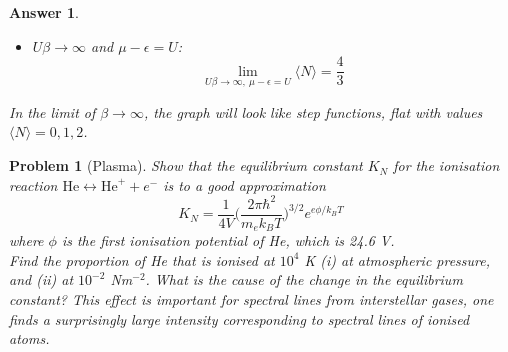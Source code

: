 \documentclass[a4paper]{article}
\theoremstyle{new2}
\newtheorem{ans}{Answer}[section]
\theoremstyle{new}
\newtheorem{qns}{Problem}[section]
\begin{document}
\begin{ans}
\begin{itemize}
    $$\lim_{U\beta\rightarrow\infty,~\mu-\epsilon>0}\langle N\rangle=2$$
    Here, $\mu$ is so large that the reservoir floods all the energy levels, hence giving maximum occupancy.
    \item $U\beta\rightarrow\infty$ and $\mu-\epsilon=U$:
    $$\lim_{U\beta\rightarrow\infty,~\mu-\epsilon=U}\langle N\rangle=\frac{4}{3}$$
\end{itemize}
In the limit of $\beta\rightarrow\infty$, the graph will look like step functions, flat with values $\langle N\rangle=0,1,2$.
\begin{center}
\end{center}
\end{ans}
\begin{qns}[Plasma]
Show that the equilibrium constant $K_N$ for the ionisation reaction $\text{He}\leftrightarrow\text{He}^++e^-$ is to a good approximation
$$K_N=\frac{1}{4V}\bigg(\frac{2\pi\hbar^2}{m_ek_BT}\bigg)^{3/2}e^{e\phi/k_BT}$$
where $\phi$ is the first ionisation potential of He, which is 24.6 V.\\[5pt]
Find the proportion of He that is ionised at $10^4$ K (i) at atmospheric pressure, and (ii) at $10^{−2}$ Nm$^{−2}$. What is the cause of the change in the equilibrium constant? This effect is important for spectral lines from interstellar gases, one finds a surprisingly large intensity corresponding to spectral lines of ionised atoms.
\end{qns}
\end{document}

